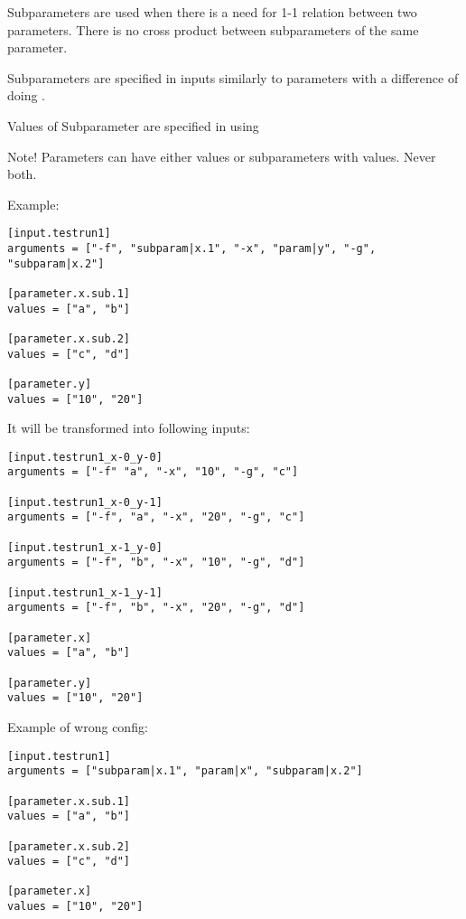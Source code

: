 \documentclass[a4paper,english]{article}
\begin{document}
\begin{adjustwidth}{18pt}{0pt}
        Subparameters are used when there is a need for 1-1 relation between two parameters.
        There is no cross product between subparameters of the same parameter.

        Subparameters are specified in inputs similarly to parameters with a difference of doing .

        Values of Subparameter are specified in  using 

        Note! Parameters can have either values or subparameters with values. Never both.

        Example:

        \begin{verbatim}
[input.testrun1]
arguments = ["-f", "subparam|x.1", "-x", "param|y", "-g", "subparam|x.2"]

[parameter.x.sub.1]
values = ["a", "b"]

[parameter.x.sub.2]
values = ["c", "d"]

[parameter.y]
values = ["10", "20"]
        \end{verbatim}

                It will be transformed into following inputs:

        \begin{verbatim}
[input.testrun1_x-0_y-0]
arguments = ["-f" "a", "-x", "10", "-g", "c"]

[input.testrun1_x-0_y-1]
arguments = ["-f", "a", "-x", "20", "-g", "c"]

[input.testrun1_x-1_y-0]
arguments = ["-f", "b", "-x", "10", "-g", "d"]

[input.testrun1_x-1_y-1]
arguments = ["-f", "b", "-x", "20", "-g", "d"]

[parameter.x]
values = ["a", "b"]

[parameter.y]
values = ["10", "20"]
        \end{verbatim}

        Example of wrong config:

        \begin{verbatim}
[input.testrun1]
arguments = ["subparam|x.1", "param|x", "subparam|x.2"]

[parameter.x.sub.1]
values = ["a", "b"]

[parameter.x.sub.2]
values = ["c", "d"]

[parameter.x]
values = ["10", "20"]
        \end{verbatim}


\end{adjustwidth}
\end{document}

